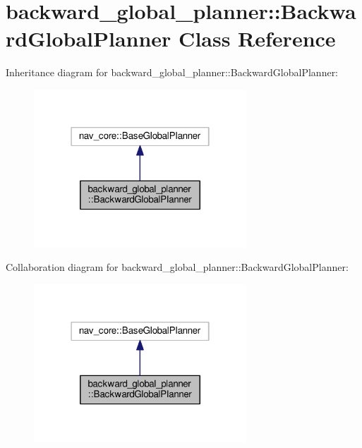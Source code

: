 \hypertarget{classbackward__global__planner_1_1BackwardGlobalPlanner}{\section{backward\-\_\-global\-\_\-planner\-:\-:Backward\-Global\-Planner Class Reference}
\label{classbackward__global__planner_1_1BackwardGlobalPlanner}
}


Inheritance diagram for backward\-\_\-global\-\_\-planner\-:\-:Backward\-Global\-Planner\-:
\nopagebreak
\begin{figure}[H]
\begin{center}
\leavevmode
\includegraphics[width=226pt]{classbackward__global__planner_1_1BackwardGlobalPlanner__inherit__graph}
\end{center}
\end{figure}


Collaboration diagram for backward\-\_\-global\-\_\-planner\-:\-:Backward\-Global\-Planner\-:
\nopagebreak
\begin{figure}[H]
\begin{center}
\leavevmode
\includegraphics[width=226pt]{classbackward__global__planner_1_1BackwardGlobalPlanner__coll__graph}
\end{center}
\end{figure}
